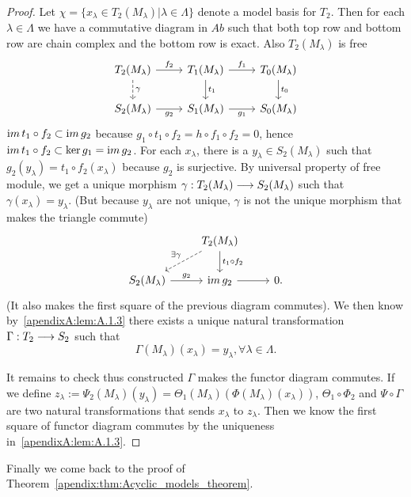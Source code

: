\documentclass[11pt]{book} %
\begin{document}
\begin{proof}
Let $\chi=\{x_\lambda\in T_2(M_\lambda)|\lambda\in \Lambda\}$ denote a model basis for $T_2$. Then for each $\lambda\in \Lambda$ we have a commutative diagram in $Ab$ such that both top row and bottom row are chain complex and the bottom row is exact. Also $T_2(M_\lambda)$ is free 
\[
\begin{tikzcd}
T_2(M_\lambda)\ar[d, dashed, "\gamma"] \arrow[r, "f_2"] & T_1(M_\lambda) \arrow[r, "f_1"] \arrow[d, "t_1"] & T_0(M_\lambda) \arrow[d, "t_0"] \\
S_2(M_\lambda) \arrow[r, "g_2"'] & S_1(M_\lambda) \arrow[r, "g_1"'] & S_0(M_\lambda)
\end{tikzcd}
\]
${\text im\thinspace} t_1\circ f_2\subset {\text im\thinspace} g_2$ because $g_1\circ t_1\circ f_2=h\circ f_1\circ f_2=0$, hence ${\text im\thinspace} t_1\circ f_2\subset \ker g_1={\text im\thinspace} g_2$. For each $x_\lambda$, there is a $y_\lambda\in S_2(M_\lambda)$ such that $g_2(y_\lambda)=t_1\circ f_2(x_\lambda)$ because $g_2$ is surjective. By universal property of free module, we get a unique morphism $\gamma:T_2(M_\lambda)\longrightarrow S_2(M_\lambda)$ such that $\gamma(x_\lambda)=y_\lambda$. (But because $y_\lambda$ are not unique, $\gamma$ is not the unique morphism that makes the triangle commute)
\[
\begin{tikzcd}
 & T_2(M_\lambda) \arrow[d, "t_1\circ f_2"] \arrow[ld, "\exists \gamma"', dashed] &  \\
S_2(M_\lambda) \arrow[r, "g_2"] & \im g_2 \arrow[r] & 0.
\end{tikzcd}
\]
(It also makes the first square of the previous diagram commutes).
We then know by~\ref{apendixA:lem:A.1.3} there exists a unique natural transformation $\Gamma: T_2\longrightarrow S_2$ such that
$$
\Gamma(M_\lambda)(x_\lambda)=y_\lambda, \forall \lambda\in \Lambda.
$$ 

It remains to check thus constructed $\Gamma$ makes the functor diagram commutes. If we define $z_\lambda:=\Psi_2(M_\lambda)(y_\lambda)=\Theta_1(M_\lambda)(\Phi(M_\lambda)(x_\lambda))$, $\Theta_1\circ\Phi_2$ and $\Psi\circ \Gamma$ are two natural transformations that sends $x_\lambda$ to $z_\lambda$. Then we know the first square of functor diagram commutes by the uniqueness in~\ref{apendixA:lem:A.1.3}.
\end{proof}
Finally we come back to the proof of Theorem~\ref{apendix:thm:Acyclic_models_theorem}.
\end{document}
